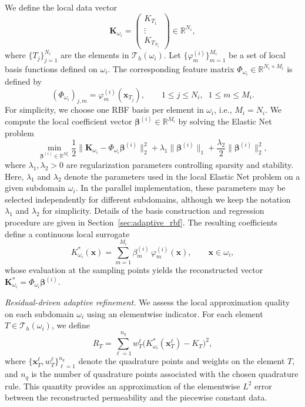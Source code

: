 \documentclass[final,1p,times]{elsarticle}
\theoremstyle{plain}
\theoremstyle{definition}
\theoremstyle{remark}
\newcommand{\Step}[2]{\item[Step #1.] #2}
\newcommand{\bx}{\mathbf{x}}
\newcommand{\bK}{\mathbf{K}}
\begin{document}
\begin{computesteps}
{We define the local data vector
$$
\bK_{\omega_i}
=
\begin{pmatrix}
K_{T_1} \\
\vdots \\
K_{T_{N_i}}
\end{pmatrix}
\in \mathbb{R}^{N_i},
$$
where $\{T_j\}_{j=1}^{N_i}$ are the elements in $\mathcal{T}_h(\omega_i)$. Let $\{\varphi_m^{(i)}\}_{m=1}^{M_i}$ be a set of local basis functions defined on $\omega_i$. The corresponding feature matrix
$
\Phi_{\omega_i} \in \mathbb{R}^{N_i \times M_i}
$
is defined by
$$
(\Phi_{\omega_i})_{j,m} = \varphi_m^{(i)}(\bx_{T_j}),
\qquad
1 \le j \le N_i,\;\; 1 \le m \le M_i.
$$
For simplicity, we choose one RBF basis per element in $\omega_i$, i.e., $M_i = N_i$. We compute the local coefficient vector $\boldsymbol{\beta}^{(i)} \in \mathbb{R}^{M_i}$ by solving the Elastic Net problem~\cite{zou2005elastic}
\begin{equation}\label{elastic}
    \min_{\boldsymbol{\beta}^{(i)}\in\mathbb{R}^{M_i}}
    \frac12\|\bK_{\omega_i}-\Phi_{\omega_i}\boldsymbol{\beta}^{(i)}\|_2^{2}
    +\lambda_1\|\boldsymbol{\beta}^{(i)}\|_1
    +\frac{\lambda_2}{2}\|\boldsymbol{\beta}^{(i)}\|_2^{2},
\end{equation}
where $\lambda_1,\lambda_2>0$ are regularization parameters controlling sparsity and stability. Here, $\lambda_1$ and $\lambda_2$ denote
the parameters used in the local Elastic Net problem on a given subdomain
$\omega_i$. In the parallel implementation, these parameters may be selected
independently for different subdomains, although we keep the notation
$\lambda_1$ and $\lambda_2$ for simplicity. Details of the basis construction and regression procedure are given in Section~\ref{sec:adaptive_rbf}. The resulting coefficients define a continuous local surrogate
\begin{equation}
K^*_{\omega_i}(\bx)
=
\sum_{m=1}^{M_i} \beta_m^{(i)} \,\varphi_m^{(i)}(\bx),
\qquad \bx\in\omega_i,
\label{eq:local_Kstar}
\end{equation}
whose evaluation at the sampling points yields the reconstructed vector
$
\bK^*_{\omega_i} = \Phi_{\omega_i}\boldsymbol{\beta}^{(i)}.
$
}


\Step{3}{\textit{Residual-driven adaptive refinement.}
We assess the local approximation quality on each subdomain $\omega_i$ using an elementwise indicator. For each element $T \in \mathcal{T}_h(\omega_i)$, we define
\begin{equation}
R_T
=
\sum_{\ell=1}^{n_q}
w_T^\ell
\bigl(K^*_{\omega_i}(\bx_T^\ell) - K_T\bigr)^2,
\end{equation}
where $\{\bx_T^\ell, w_T^\ell\}_{\ell=1}^{n_q}$ denote the quadrature points and weights on the element $T$, and $n_q$ is the number of quadrature points associated with the chosen quadrature rule. This quantity provides an approximation of the elementwise $L^2$ error between the reconstructed permeability and the piecewise constant data.

}
\end{computesteps}
\end{document}
